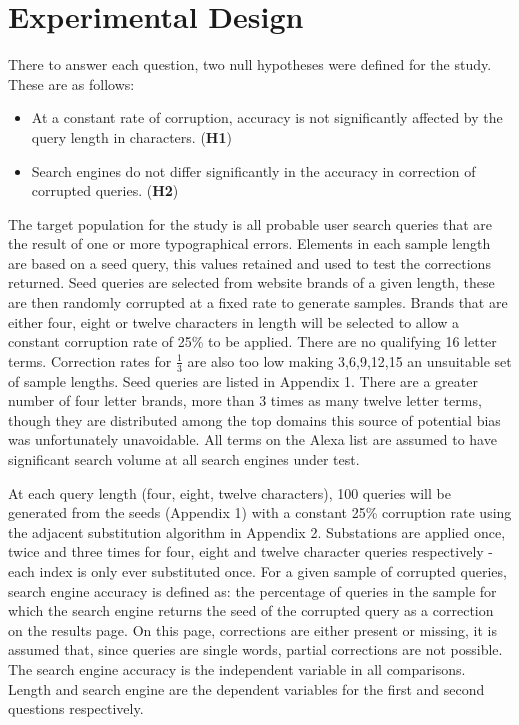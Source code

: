 \documentclass{csfourzero}
\begin{document}
\section{Experimental Design}
\label{sec:exp}

There to answer each question, two null hypotheses were defined for the study. These are as follows:
\begin{itemize}
  \item{At a constant rate of corruption, accuracy is not significantly affected by the query length in characters. (\textbf{H1})}
  \item{Search engines do not differ significantly in the accuracy in correction of corrupted queries. (\textbf{H2})}
\end{itemize}

\noindent
The target population for the study is all probable user search queries that are the result of one or more typographical errors. Elements in each sample length are based on a seed query, this values retained and used to test the corrections returned. Seed queries are selected from website brands of a given length, these are then randomly corrupted at a fixed rate to generate samples. Brands that are either four, eight or twelve characters in length will be selected to allow a constant corruption rate of 25\% to be applied. There are no qualifying 16 letter terms. Correction rates for $\frac{1}{3}$ are also too low making 3,6,9,12,15 an unsuitable set of sample lengths. Seed queries are listed in Appendix 1. There are a greater number of four letter brands, more than 3 times as many twelve letter terms, though they are distributed among the top domains this source of potential bias was unfortunately unavoidable. All terms on the Alexa list are assumed to have significant search volume at all search engines under test.

At each query length (four, eight, twelve characters), 100 queries will be generated from the seeds (Appendix 1) with a constant 25\% corruption rate using the adjacent substitution algorithm in Appendix 2. Substations are applied once, twice and three times for four, eight and twelve character queries respectively - each index is only ever substituted once. For a given sample of corrupted queries, search engine accuracy is defined as: the percentage of queries in the sample for which the search engine returns the seed of the corrupted query as a correction on the results page. On this page, corrections are either present or missing, it is assumed that, since queries are single words, partial corrections are not possible. The search engine accuracy is the independent variable in all comparisons. Length and search engine are the dependent variables for the first and second questions respectively.
\end{document}
